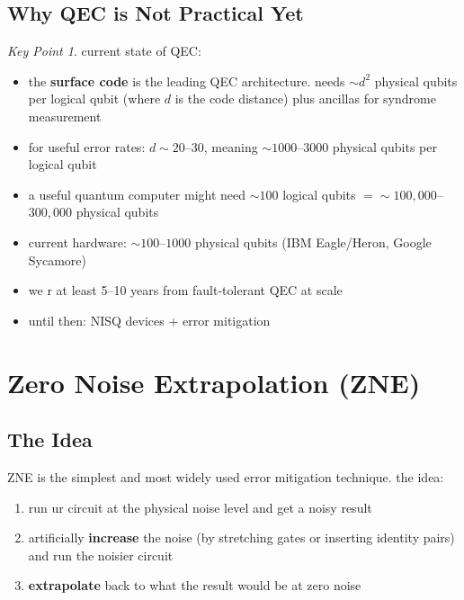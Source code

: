 \documentclass[11pt,a4paper]{article}
\theoremstyle{definition}
\theoremstyle{remark}
\newtheorem*{keypoint}{Key Point}
\begin{document}
\subsection{Why QEC is Not Practical Yet}

\begin{keypoint}
current state of QEC:
\begin{itemize}
    \item the \textbf{surface code} is the leading QEC architecture. needs $\sim d^2$ physical qubits per logical qubit (where $d$ is the code distance) plus ancillas for syndrome measurement
    \item for useful error rates: $d \sim 20$--$30$, meaning $\sim 1000$--$3000$ physical qubits per logical qubit
    \item a useful quantum computer might need $\sim 100$ logical qubits $= \sim 100{,}000$--$300{,}000$ physical qubits
    \item current hardware: $\sim 100$--$1000$ physical qubits (IBM Eagle/Heron, Google Sycamore)
    \item we r at least 5--10 years from fault-tolerant QEC at scale
    \item until then: NISQ devices + error mitigation
\end{itemize}
\end{keypoint}

\section{Zero Noise Extrapolation (ZNE)}

\subsection{The Idea}

ZNE is the simplest and most widely used error mitigation technique. the idea:

\begin{enumerate}
    \item run ur circuit at the physical noise level and get a noisy result
    \item artificially \textbf{increase} the noise (by stretching gates or inserting identity pairs) and run the noisier circuit
    \item \textbf{extrapolate} back to what the result would be at zero noise
\end{enumerate}
\end{document}
